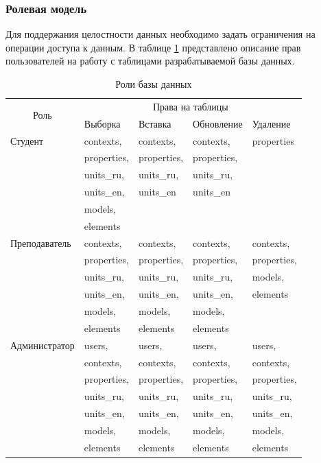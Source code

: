 \subsubsection{Ролевая модель}

Для поддержания целостности данных необходимо задать ограничения на операции доступа к данным. В таблице \ref{tbl:roles} представлено описание прав пользователей на работу с таблицами разрабатываемой базы данных.

\begin{table}[h]
	\begin{center}
		\captionsetup{justification=RaggedRight, singlelinecheck=off}
		\caption{Роли базы данных}
		\label{tbl:roles}
		\begin{tabular}{|l|l|l|l|l|}
			\hline
			\multicolumn{1}{|c|}{\multirow{2}[4]{*}{Роль}} & \multicolumn{4}{c|}{Права на таблицы} \bigstrut\\
			\cline{2-5} \multicolumn{1}{|c|}{} & Выборка & Вставка & Обновление & Удаление \bigstrut\\
			\hline
			Студент & contexts, & contexts, & contexts, & properties \\
			 		& properties, & properties, & properties, &  \\
			 		& units\_ru, & units\_ru, & units\_ru, &  \\
			 		& units\_en, & units\_en & units\_en &  \\
			 		& models, &  &  &  \\
			 		& elements &  &  &  \\
			\hline
			Преподаватель & contexts, & contexts, & contexts, & contexts, \\
					& properties, & properties, & properties, & properties, \\
					& units\_ru, & units\_ru, & units\_ru, & models, \\
					& units\_en, & units\_en, & units\_en, & elements \\
					& models, & models, & models, &  \\
					& elements & elements & elements &  \\
			\hline
			Администратор & users, & users, & users, & users, \\
					& contexts, & contexts, & contexts, & contexts, \\
					& properties, & properties, & properties, & properties, \\
					& units\_ru, & units\_ru, & units\_ru, & units\_ru, \\
					& units\_en, & units\_en, & units\_en, & units\_en, \\
					& models, & models, & models, & models, \\
					& elements & elements & elements & elements \\
			\hline
		\end{tabular}
	\end{center}
\end{table}


